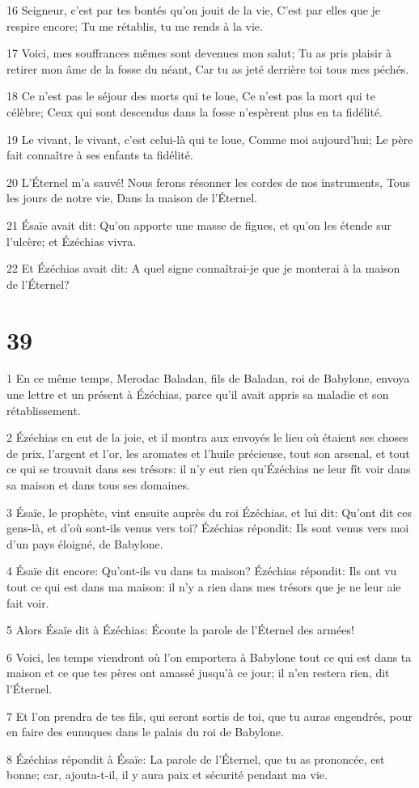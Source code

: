 \par 16 Seigneur, c'est par tes bontés qu'on jouit de la vie, C'est par elles que je respire encore; Tu me rétablis, tu me rends à la vie.
\par 17 Voici, mes souffrances mêmes sont devenues mon salut; Tu as pris plaisir à retirer mon âme de la fosse du néant, Car tu as jeté derrière toi tous mes péchés.
\par 18 Ce n'est pas le séjour des morts qui te loue, Ce n'est pas la mort qui te célèbre; Ceux qui sont descendus dans la fosse n'espèrent plus en ta fidélité.
\par 19 Le vivant, le vivant, c'est celui-là qui te loue, Comme moi aujourd'hui; Le père fait connaître à ses enfants ta fidélité.
\par 20 L'Éternel m'a sauvé! Nous ferons résonner les cordes de nos instruments, Tous les jours de notre vie, Dans la maison de l'Éternel.
\par 21 Ésaïe avait dit: Qu'on apporte une masse de figues, et qu'on les étende sur l'ulcère; et Ézéchias vivra.
\par 22 Et Ézéchias avait dit: A quel signe connaîtrai-je que je monterai à la maison de l'Éternel?

\chapter{39}

\par 1 En ce même temps, Merodac Baladan, fils de Baladan, roi de Babylone, envoya une lettre et un présent à Ézéchias, parce qu'il avait appris sa maladie et son rétablissement.
\par 2 Ézéchias en eut de la joie, et il montra aux envoyés le lieu où étaient ses choses de prix, l'argent et l'or, les aromates et l'huile précieuse, tout son arsenal, et tout ce qui se trouvait dans ses trésors: il n'y eut rien qu'Ézéchias ne leur fît voir dans sa maison et dans tous ses domaines.
\par 3 Ésaïe, le prophète, vint ensuite auprès du roi Ézéchias, et lui dit: Qu'ont dit ces gens-là, et d'où sont-ils venus vers toi? Ézéchias répondit: Ils sont venus vers moi d'un pays éloigné, de Babylone.
\par 4 Ésaïe dit encore: Qu'ont-ils vu dans ta maison? Ézéchias répondit: Ils ont vu tout ce qui est dans ma maison: il n'y a rien dans mes trésors que je ne leur aie fait voir.
\par 5 Alors Ésaïe dit à Ézéchias: Écoute la parole de l'Éternel des armées!
\par 6 Voici, les temps viendront où l'on emportera à Babylone tout ce qui est dans ta maison et ce que tes pères ont amassé jusqu'à ce jour; il n'en restera rien, dit l'Éternel.
\par 7 Et l'on prendra de tes fils, qui seront sortis de toi, que tu auras engendrés, pour en faire des eunuques dans le palais du roi de Babylone.
\par 8 Ézéchias répondit à Ésaïe: La parole de l'Éternel, que tu as prononcée, est bonne; car, ajouta-t-il, il y aura paix et sécurité pendant ma vie.

